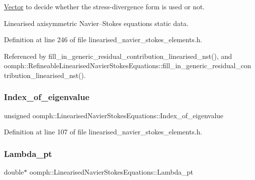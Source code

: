 \hyperlink{classoomph_1_1Vector}{Vector} to decide whether the stress-\/divergence form is used or not. 

Linearised axisymmetric Navier--Stokes equations static data. 

Definition at line 246 of file linearised\+\_\+navier\+\_\+stokes\+\_\+elements.\+h.



Referenced by fill\+\_\+in\+\_\+generic\+\_\+residual\+\_\+contribution\+\_\+linearised\+\_\+nst(), and oomph\+::\+Refineable\+Linearised\+Navier\+Stokes\+Equations\+::fill\+\_\+in\+\_\+generic\+\_\+residual\+\_\+contribution\+\_\+linearised\+\_\+nst().

\mbox{\label{classoomph_1_1LinearisedNavierStokesEquations_ac2fce4ec639504d66b9472219da83aad}} 
\subsubsection{\texorpdfstring{Index\+\_\+of\+\_\+eigenvalue}{Index\_of\_eigenvalue}}
{\footnotesize\ttfamily unsigned oomph\+::\+Linearised\+Navier\+Stokes\+Equations\+::\+Index\+\_\+of\+\_\+eigenvalue\hspace{0.3cm}{\ttfamily [protected]}}



Definition at line 107 of file linearised\+\_\+navier\+\_\+stokes\+\_\+elements.\+h.

\mbox{\label{classoomph_1_1LinearisedNavierStokesEquations_a7ad98ab2eaa268bfb6a2a92122f42ae6}} 
\subsubsection{\texorpdfstring{Lambda\+\_\+pt}{Lambda\_pt}}
{\footnotesize\ttfamily double$\ast$ oomph\+::\+Linearised\+Navier\+Stokes\+Equations\+::\+Lambda\+\_\+pt\hspace{0.3cm}{\ttfamily [protected]}}



